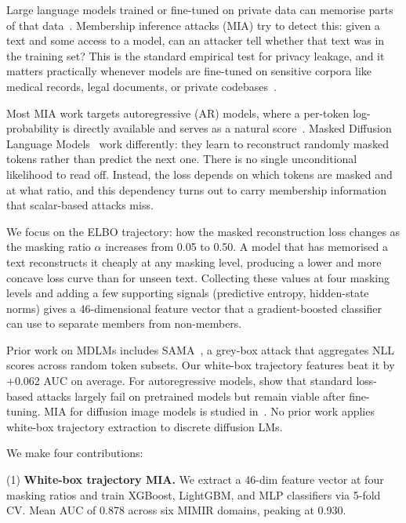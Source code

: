 Large language models trained or fine-tuned on private data can memorise parts
of that data~\citep{carlini2021extracting,shokri2017membership}.
Membership inference attacks (MIA) try to detect this: given a text and some
access to a model, can an attacker tell whether that text was in the training set?
This is the standard empirical test for privacy leakage, and it matters practically
whenever models are fine-tuned on sensitive corpora like medical records, legal
documents, or private codebases~\citep{carlini2022membership}.

Most MIA work targets autoregressive (AR) models, where a per-token log-probability
is directly available and serves as a natural score~\citep{duan2024mimir,yeom2018privacy}.
Masked Diffusion Language Models~\citep{austin2021d3pm,sahoo2024mdlm,nieLLaDA2025}
work differently: they learn to reconstruct randomly masked tokens rather than
predict the next one. There is no single unconditional likelihood to read off.
Instead, the loss depends on which tokens are masked and at what ratio, and this
dependency turns out to carry membership information that scalar-based attacks miss.

We focus on the ELBO trajectory: how the masked reconstruction loss changes as
the masking ratio $\alpha$ increases from 0.05 to 0.50.
A model that has memorised a text reconstructs it cheaply at any masking level,
producing a lower and more concave loss curve than for unseen text.
Collecting these values at four masking levels and adding a few supporting signals
(predictive entropy, hidden-state norms) gives a 46-dimensional feature vector
that a gradient-boosted classifier can use to separate members from non-members.

Prior work on MDLMs includes SAMA~\citep{shi2025sama}, a grey-box attack that
aggregates NLL scores across random token subsets. Our white-box trajectory
features beat it by +0.062 AUC on average. For autoregressive models,
\citet{duan2024mimir} show that standard loss-based attacks largely fail on
pretrained models but remain viable after fine-tuning.
MIA for diffusion image models is studied in~\citet{dockhorn2022dpdm}.
No prior work applies white-box trajectory extraction to discrete diffusion LMs.

We make four contributions:

(1) \textbf{White-box trajectory MIA.} We extract a 46-dim feature vector at four masking
ratios and train XGBoost, LightGBM, and MLP classifiers via 5-fold CV.
Mean AUC of 0.878 across six MIMIR domains, peaking at 0.930.

